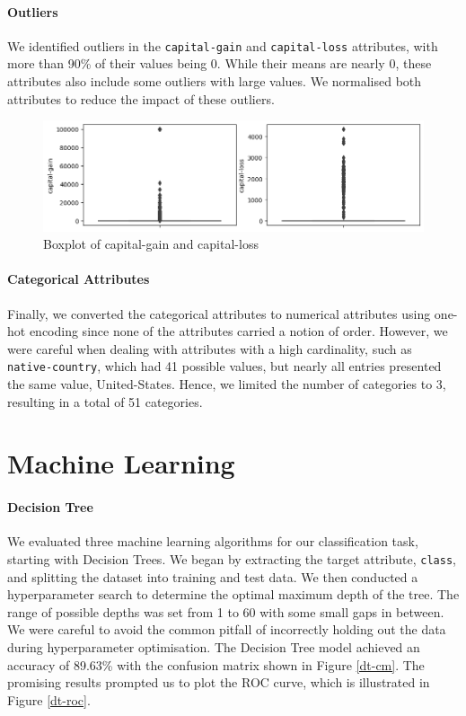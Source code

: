 \documentclass[twocolumn]{article}
\newcommand{\attr}[1]{\texttt{#1}}
\begin{document}
    \paragraph{Outliers}
    We identified outliers in the \attr{capital-gain} and \attr{capital-loss} attributes, with more than 90\% of their values being 0.
    While their means are nearly 0, these attributes also include some outliers with large values.
    We normalised both attributes to reduce the impact of these outliers.

    \begin{figure}[htbp]
        \centerline{\includegraphics[width=\columnwidth]{images/outliers.png}}
        \caption{Boxplot of capital-gain and capital-loss}
        \label{outliers}
    \end{figure}

    \paragraph{Categorical Attributes}
    Finally, we converted the categorical attributes to numerical attributes using one-hot encoding since none of the attributes carried a notion of order.
    However, we were careful when dealing with attributes with a high cardinality, such as \attr{native-country}, which had 41 possible values,
    but nearly all entries presented the same value, United-States.
    Hence, we limited the number of categories to 3, resulting in a total of 51 categories.

\section{Machine Learning}

    \paragraph{Decision Tree}
    We evaluated three machine learning algorithms for our classification task, starting with Decision Trees. We began by extracting the target attribute, \attr{class}, and splitting the dataset into training and test data. We then conducted a hyperparameter search to determine the optimal maximum depth of the tree. The range of possible depths was set from 1 to 60 with some small gaps in between. We were careful to avoid the common pitfall of incorrectly holding out the data during hyperparameter optimisation. The Decision Tree model achieved an accuracy of 89.63\% with the confusion matrix shown in Figure \ref{dt-cm}. The promising results prompted us to plot the ROC curve, which is illustrated in Figure \ref{dt-roc}.
\end{document}
